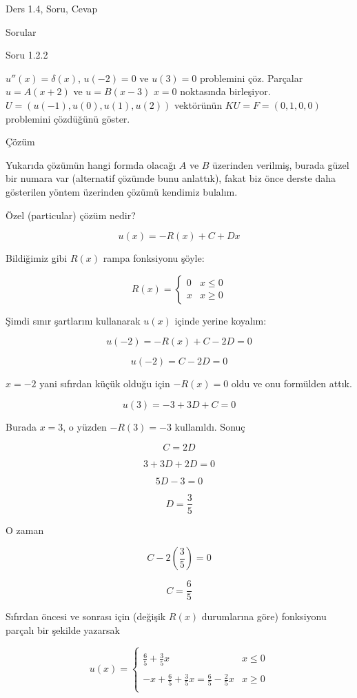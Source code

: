 \documentclass[12pt,fleqn]{article}\usepackage{../../common}
\begin{document}
Ders 1.4, Soru, Cevap


Sorular

Soru 1.2.2

$u''(x) = \delta(x)$, $u(-2) = 0$ ve $u(3) = 0$ problemini çöz. Parçalar
$u = A(x+2)$ ve $u=B(x-3)$ $x=0$ noktasında birleşiyor.
$U = (u(-1), u(0), u(1), u(2))$ vektörünün $KU=F=(0,1,0,0)$ problemini
çözdüğünü göster.

Çözüm

Yukarıda çözümün hangi formda olacağı $A$ ve $B$ üzerinden verilmiş, burada
güzel bir numara var (alternatif çözümde bunu anlattık), fakat biz önce
derste daha gösterilen yöntem üzerinden çözümü kendimiz bulalım.

Özel (particular) çözüm nedir? 

$$ u(x) = -R(x) + C + Dx$$

Bildiğimiz gibi $R(x)$ rampa fonksiyonu şöyle:

$$ 
R(x) = \left\{ \begin{array}{ll}
0 & x \le 0 \\
x & x \ge 0 
\end{array} \right.
 $$

Şimdi sınır şartlarını kullanarak $u(x)$ içinde yerine koyalım:

$$ u(-2) = -R(x) + C - 2D = 0 $$

$$ u(-2) = C - 2D = 0 $$

$x=-2$ yani sıfırdan küçük olduğu için $-R(x)=0$ oldu ve onu formülden attık.

$$ u(3) = -3 + 3D + C = 0 $$

Burada $x=3$, o yüzden $-R(3) = -3$ kullanıldı. Sonuç

$$ C = 2D $$

$$ 3 + 3D + 2D = 0 $$

$$ 5D - 3 = 0 $$

$$ D = \frac{3}{5} $$

O zaman

$$ C - 2(\frac{3}{5}) = 0 $$

$$ C = \frac{6}{5} $$

Sıfırdan öncesi ve sonrası için (değişik $R(x)$ durumlarına göre)
fonksiyonu parçalı bir şekilde yazarsak

$$ u(x) =
\left\{ \begin{array}{ll}
& \\
\frac{6}{5} + \frac{3}{5}x & x \le 0 \\
& \\
-x + \frac{6}{5} + \frac{3}{5}x = \frac{6}{5} - \frac{2}{5}x & x \ge 0 \\
& 
\end{array} \right.
 $$
\end{document}

